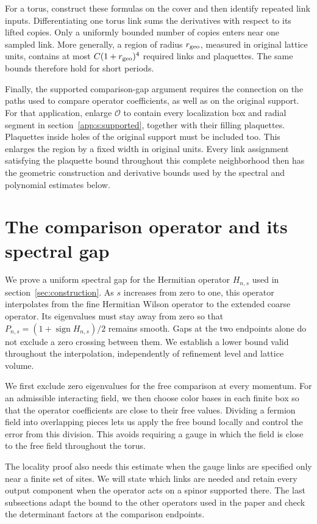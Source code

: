 \documentclass[11pt,a4paper]{article}
\theoremstyle{remark}
\begin{document}
For a torus, construct these formulas on the cover and then identify
repeated link inputs. Differentiating one torus link sums the derivatives
with respect to its lifted copies. Only a uniformly bounded number of
copies enters near one sampled link. More generally, a region of radius
$r_{\rm geo}$, measured in original lattice units, contains at most
$C(1+r_{\rm geo})^4$ required links and plaquettes. The same bounds therefore hold for short periods.

Finally, the supported comparison-gap argument requires the connection on
the paths used to compare operator coefficients, as well as on the
original support. For that application, enlarge $\mathcal O$ to
contain every localization box and radial segment in
section~\ref{app:s:supported}, together with their filling plaquettes.
Plaquettes inside holes of the original support must be included too.
This enlarges the region by a fixed width in original units. Every link
assignment satisfying the plaquette bound throughout this complete
neighborhood then has the geometric construction and derivative bounds
used by the spectral and polynomial estimates below.

\section{The comparison operator and its spectral gap}
\label{app:s:spectral}

We prove a uniform spectral gap for the Hermitian operator $H_{n,s}$
used in section~\ref{sec:construction}. As $s$ increases from zero to
one, this operator interpolates from the fine Hermitian Wilson operator
to the extended coarse operator. Its eigenvalues must stay away from
zero so that $P_{n,s}=(1+\operatorname{sign}H_{n,s})/2$ remains
smooth. Gaps at the two endpoints alone do not exclude a zero crossing
between them. We establish a lower bound valid throughout the
interpolation, independently of refinement level and lattice volume.

We first exclude zero eigenvalues for the free comparison at every
momentum. For an admissible interacting field, we then choose color bases
in each finite box so that the operator coefficients are close to their
free values. Dividing a fermion field into overlapping pieces lets us
apply the free bound locally and control the error from this division.
This avoids requiring a gauge in which the field is close to the free
field throughout the torus.

The locality proof also needs this estimate when the gauge links are
specified only near a finite set of sites. We will state which
links are needed and retain every output component when the operator
acts on a spinor supported there. The last subsections adapt the bound
to the other operators used in the paper and check the determinant
factors at the comparison endpoints.
\end{document}
